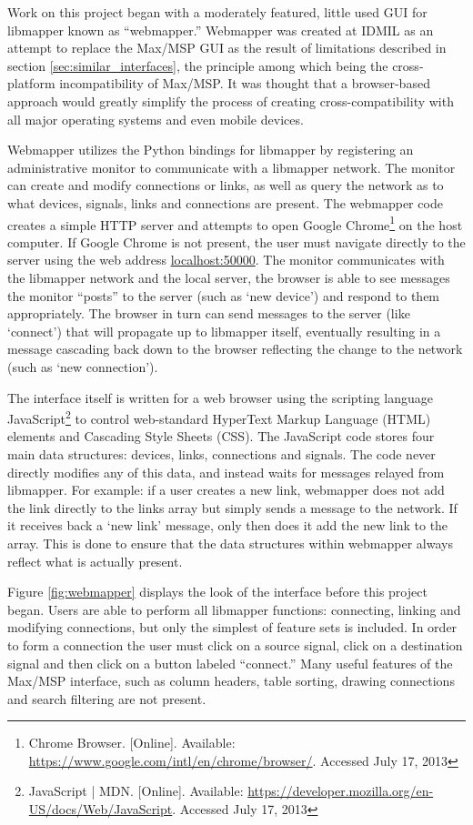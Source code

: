 Work on this project began with a moderately featured, little used GUI for libmapper known as ``webmapper.'' Webmapper was created at IDMIL as an attempt to replace the Max/MSP GUI as the result of limitations described in section \ref{sec:similar_interfaces}, the principle among which being the cross-platform incompatibility of Max/MSP. It was thought that a browser-based approach would greatly simplify the process of creating cross-compatibility with all major operating systems and even mobile devices. 

Webmapper utilizes the Python bindings for libmapper by registering an administrative monitor to communicate with a libmapper network. The monitor can create and modify connections or links, as well as query the network as to what devices, signals, links and connections are present. The webmapper code creates a simple HTTP server and attempts to open Google Chrome\footnote{Chrome Browser. [Online]. Available: \url{https://www.google.com/intl/en/chrome/browser/}. Accessed July 17, 2013} on the host computer. If Google Chrome is not present, the user must navigate directly to the server using the web address \url{localhost:50000}. The monitor communicates with the libmapper network and the local server, the browser is able to see messages the monitor ``posts'' to the server (such as `new device') and respond to them appropriately. The browser in turn can send messages to the server (like `connect') that will propagate up to libmapper itself, eventually resulting in a message cascading back down to the browser reflecting the change to the network (such as `new connection'). 

The interface itself is written for a web browser using the scripting language JavaScript\footnote{JavaScript | MDN. [Online]. Available: \url{https://developer.mozilla.org/en-US/docs/Web/JavaScript}. Accessed July 17, 2013} to control web-standard HyperText Markup Language (HTML) elements and Cascading Style Sheets (CSS). The JavaScript code stores four main data structures: devices, links, connections and signals. The code never directly modifies any of this data, and instead waits for messages relayed from libmapper. For example: if a user creates a new link, webmapper does not add the link directly to the links array but simply sends a message to the network. If it receives back a `new link' message, only then does it add the new link to the array. This is done to ensure that the data structures within webmapper always reflect what is actually present.

Figure \ref{fig:webmapper} displays the look of the interface before this project began. Users are able to perform all libmapper functions: connecting, linking and modifying connections, but only the simplest of feature sets is included. In order to form a connection the user must click on a source signal, click on a destination signal and then click on a button labeled ``connect.'' Many useful features of the Max/MSP interface, such as column headers, table sorting, drawing connections and search filtering are not present.

